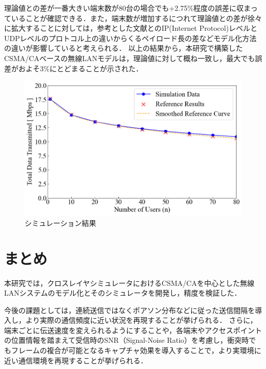 \documentclass[a4paper, 10pt]{ltjsarticle}
\begin{document}
理論値との差が一番大きい端末数が80台の場合でも+2.75\%程度の誤差に収まっていることが確認できる．また，端末数が増加するにつれて理論値との差が徐々に拡大することに対しては，参考とした文献\cite{paper}とのIP(Internet Protocol)レベルとUDPレベルのプロトコル上の違いからくるペイロード長の差などモデル化方法の違いが影響していると考えられる．
以上の結果から，本研究で構築したCSMA/CAベースの無線LANモデルは，理論値に対して概ね一致し，最大でも誤差がおよそ3\%にとどまることが示された．

\begin{figure}[htbp]
  \centering
  \includegraphics[width=1\columnwidth]{./assets/g3.png}
  \caption{シミュレーション結果}
  \label{fig:simulation-result}
\end{figure}

\vspace{-2em}

\section{まとめ}

本研究では，クロスレイヤシミュレータにおけるCSMA/CAを中心とした無線LANシステムのモデル化とそのシミュレータを開発し，精度を検証した．

今後の課題としては，連続送信ではなくポアソン分布などに従った送信間隔を導入し，より実際の通信頻度に近い状況を再現することが挙げられる．
さらに，端末ごとに伝送速度を変えられるようにすることや，各端末やアクセスポイントの位置情報を踏まえて受信時のSNR（Signal-Noise Ratio）を考慮し，衝突時でもフレームの複合が可能となるキャプチャ効果を導入することで，より実環境に近い通信環境を再現することが挙げられる．

\vspace{-0.5em}
\end{document}

